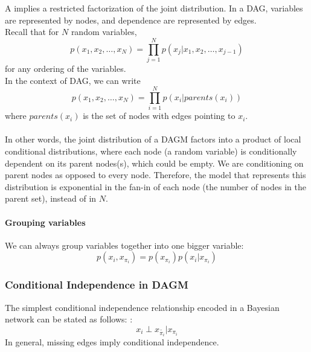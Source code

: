 \documentclass[11pt]{article}
\begin{document}
A  implies a restricted factorization of the joint distribution. In a DAG, variables are represented by nodes, and dependence are represented by edges. \\
Recall that for \(N\) random variables,
$$p(x_1, x_2, \hdots, x_N) = \prod_{j=1}^N p(x_j|x_1,x_2,\hdots,x_{j-1})$$
for any ordering of the variables. \\
In the context of DAG, we can write
$$p(x_1, x_2, \hdots, x_N) = \prod_{i=1}^N p(x_i |parents(x_i))$$
where $parents(x_i)$ is the set of nodes with edges pointing to $x_i$.\\\\
In other words, the joint distribution of a DAGM factors into a product of local conditional distributions, where each node (a random variable) is conditionally dependent on its parent  nodes(s), which could be empty.
\remark
We are conditioning on parent nodes as opposed to every node. Therefore, the model that represents this distribution is exponential in the fan-in of each node (the number of nodes in the parent set), instead of in $N$.

\paragraph{Grouping variables}
We can always group variables together into one bigger variable:
$$p(x_i, x_{\pi_i}) = p(x_{\pi_i})p(x_i|x_{\pi_i})$$

\subsubsection{Conditional Independence in DAGM}
The simplest conditional independence relationship encoded in a Bayesian network can be stated as follows: :
$$x_i \perp x_{\tilde{\pi_i}} | x_{\pi_i}$$
In general, missing edges imply conditional independence.
\end{document}
